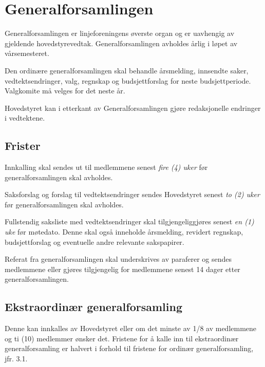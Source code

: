 \chapter{Generalforsamlingen}

Generalforsamlingen er linjeforeningens øverste organ og er uavhengig av gjeldende hovedstyrevedtak. Generalforsamlingen avholdes årlig i løpet av vårsemesteret.\newline

Den ordinære generalforsamlingen skal behandle årsmelding, innsendte saker, vedtektsendringer, valg, regnskap og budsjettforslag for neste budsjettperiode. Valgkomite må velges for det neste år.\newline

Hovedstyret kan i etterkant av Generalforsamlingen gjøre redaksjonelle endringer i vedtektene.  

\section{Frister}
\label{sec:frister}
\begin{liste}
	\item Innkalling skal sendes ut til medlemmene senest \emph{fire (4) uker}  før \mbox{generalforsamlingen} skal avholdes.
	\item Saksforslag og forslag til vedtektsendringer sendes Hovedstyret senest \emph{to (2) uker} før generalforsamlingen skal avholdes.
	\item Fullstendig saksliste med vedtektsendringer skal tilgjengeliggjøres senest \emph{en (1) uke} før møtedato. Denne skal også inneholde årsmelding, revidert regnskap, budsjettforslag og eventuelle andre relevante sakspapirer.
	\item Referat fra generalforsamlingen skal underskrives av paraferer og sendes \linebreak medlemmene eller gjøres tilgjengelig for medlemmene senest 14 dager etter generalforsamlingen.
\end{liste}


\section{Ekstraordinær generalforsamling}
\vspace{23pt}
Denne kan innkalles av Hovedstyret eller om det minste av 1/8 av medlemmene og ti (10) medlemmer ønsker det. Fristene for å kalle inn til ekstraordinær generalforsamling er halvert i forhold til fristene for ordinær generalforsamling, jfr. 3.1.\newline


